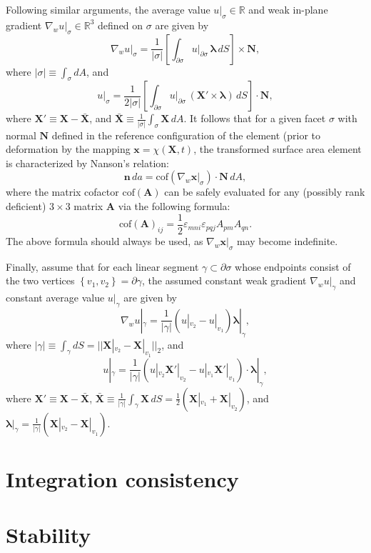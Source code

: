 \documentclass[10pt,a4paper]{article}
\begin{document}
Following similar arguments, the average value $u |_{\sigma} \in \mathbb{R}$ and weak in-plane gradient $\nabla_w u |_{\sigma} \in \mathbb{R}^3$ defined on $\sigma$ are given by
\begin{equation}
  \nabla_{w} u |_{\sigma} = \frac{1}{|\sigma|} \left[ \int_{\partial \sigma} u |_{\partial \sigma} \, \boldsymbol{\lambda} \, dS \right] \times \mathbf{N},
\end{equation}
where $|\sigma| \equiv \int_{\sigma} dA$, and
\begin{equation}
	u |_{\sigma} = \frac{1}{2 | \sigma |} \left[ \int_{\partial \sigma} u |_{\partial \sigma} \, ( \mathbf{X}' \times \boldsymbol{\lambda} ) \, dS \right] \cdot \mathbf{N},
\end{equation}
where $\mathbf{X}' \equiv \mathbf{X} - \bar{\mathbf{X}}$, and $\bar{\mathbf{X}} \equiv \frac{1}{|\sigma|} \int_{\sigma} \mathbf{X} \, dA$. It follows that for a given facet $\sigma$ with normal $\mathbf{N}$ defined in the reference configuration of the element (prior to deformation by the mapping $\mathbf{x} = \chi (\mathbf{X},t)$, the transformed surface area element is characterized by Nanson's relation:
\begin{equation}
	\mathbf{n} \, da = \text{cof} \left( \nabla_w \mathbf{x} |_{\sigma} \right) \cdot \mathbf{N} \, dA,
\end{equation}
where the matrix cofactor $\text{cof} \left( \mathbf{A} \right)$ can be safely evaluated for any (possibly rank deficient) $3\times3$ matrix $\mathbf{A}$ via the following formula:
\begin{equation}
	\text{cof} \left( \mathbf{A} \right)_{ij} = \frac{1}{2} \varepsilon_{mni} \varepsilon_{pqj} A_{pm} A_{qn} .
\end{equation}
The above formula should always be used, as $\nabla_w \mathbf{x} |_{\sigma}$ may become indefinite.

Finally, assume that for each linear segment $\gamma \subset \partial \sigma$ whose endpoints consist of the two vertices $\left\{ v_1, v_2 \right\} = \partial \gamma$, the assumed constant weak gradient $\nabla_w u |_{\gamma}$ and constant average value $u |_{\gamma}$ are given by
\begin{equation}
  \nabla_{w} u |_{\gamma} = \frac{1}{|\gamma|} (u |_{v_2} - u |_{v_1}) \boldsymbol{\lambda} |_{\gamma},
\end{equation}
where $|\gamma| \equiv \int_{\gamma} dS = || \mathbf{X} |_{v_2} - \mathbf{X} |_{v_1} ||_2$, and
\begin{equation}
	u |_{\gamma} = \frac{1}{| \gamma |} (u |_{v_2} \mathbf{X}' |_{v_2} - u |_{v_1} \mathbf{X}' |_{v_1}) \cdot \boldsymbol{\lambda} |_{\gamma},
\end{equation}
where $\mathbf{X}' \equiv \mathbf{X} - \bar{\mathbf{X}}$, $\bar{\mathbf{X}} \equiv \frac{1}{|\gamma|} \int_{\gamma} \mathbf{X} \, dS = \frac{1}{2} (\mathbf{X} |_{v_1} + \mathbf{X} |_{v_2})$, and $\boldsymbol{\lambda} |_{\gamma} = \frac{1}{| \gamma |} (\mathbf{X} |_{v_2} - \mathbf{X} |_{v_1})$.

\section{Integration consistency}



\section{Stability}
\end{document}

